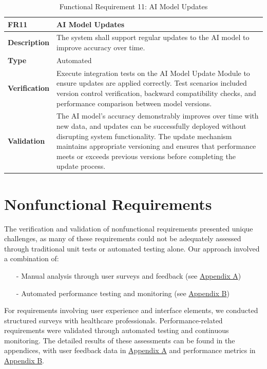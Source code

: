 \documentclass[12pt, titlepage]{article}
\begin{document}
\begin{table}[h!]
\centering
{}
\begin{tabular}{|p{3.5cm}|p{11.5cm}|}
\hline
\rowcolor{gray!30}
\textbf{FR11} & \textbf{AI Model Updates} \\
\hline
\textbf{Description} & The system shall support regular updates to the AI model to improve accuracy over time.\\
\hline
\textbf{Type} & Automated \\
\hline
\textbf{Verification} & Execute integration tests on the AI Model Update Module to ensure updates are applied correctly. Test scenarios included version control verification, backward compatibility checks, and performance comparison between model versions. \\
\hline
\textbf{Validation} & The AI model's accuracy demonstrably improves over time with new data, and updates can be successfully deployed without disrupting system functionality. The update mechanism maintains appropriate versioning and ensures that performance meets or exceeds previous versions before completing the update process. \\
\hline
\end{tabular}
\caption{Functional Requirement 11: AI Model Updates}
\end{table}

\clearpage
\newpage
\section{Nonfunctional Requirements}

\noindent The verification and validation of nonfunctional requirements presented unique challenges, as many of these requirements could not be adequately assessed through traditional unit tests or automated testing alone. Our approach involved a combination of:

\begin{itemize}
    \item[-] Manual analysis through user surveys and feedback (see \hyperref[appendix:A]{Appendix A}) 
    \item[-] Automated performance testing and monitoring (see \hyperref[appendix:B]{Appendix B})
\end{itemize}

\noindent For requirements involving user experience and interface elements, we conducted structured surveys with healthcare professionals. Performance-related requirements were validated through automated testing and continuous monitoring. The detailed results of these assessments can be found in the appendices, with user feedback data in \href{#appendix:A}{Appendix A} and performance metrics in \href{#appendix:B}{Appendix B}.
\end{document}
